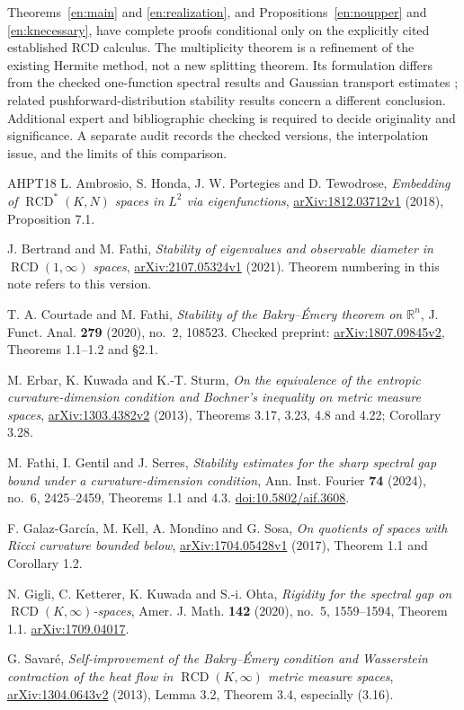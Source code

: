 \documentclass[12pt]{amsart}
\theoremstyle{definition}
\theoremstyle{remark}
\numberwithin{equation}{section}
\newcommand{\R}{\mathbb{R}}
\theoremstyle{plain}
\begin{document}
Theorems~\ref{en:main} and \ref{en:realization}, and
Propositions~\ref{en:noupper} and \ref{en:knecessary}, have complete
proofs conditional only on the explicitly cited established RCD calculus.
The multiplicity theorem is a refinement of the existing Hermite method,
not a new splitting theorem. Its formulation differs from the checked
one-function spectral results and Gaussian transport estimates
\cite{en:BF,en:CF}; related pushforward-distribution stability results
\cite{en:Serres} concern a different conclusion. Additional expert and
bibliographic checking is required to decide originality and significance.
A separate audit records the checked versions, the interpolation issue,
and the limits of this comparison.
\begin{thebibliography}{AHPT18}
L. Ambrosio, S. Honda, J. W. Portegies and D. Tewodrose,
\emph{Embedding of $\operatorname{RCD}^{*}(K,N)$ spaces in $L^2$ via eigenfunctions},
\href{https://arxiv.org/abs/1812.03712v1}{arXiv:1812.03712v1} (2018), Proposition 7.1.

J. Bertrand and M. Fathi,
\emph{Stability of eigenvalues and observable diameter in
$\operatorname{RCD}(1,\infty)$ spaces},
\href{https://arxiv.org/abs/2107.05324v1}{arXiv:2107.05324v1} (2021).
Theorem numbering in this note refers to this version.

T. A. Courtade and M. Fathi,
\emph{Stability of the Bakry--\'Emery theorem on $\R^n$},
J. Funct. Anal. \textbf{279} (2020), no.~2, 108523.
Checked preprint: \href{https://arxiv.org/abs/1807.09845v2}{arXiv:1807.09845v2},
Theorems 1.1--1.2 and \S2.1.

M. Erbar, K. Kuwada and K.-T. Sturm,
\emph{On the equivalence of the entropic curvature-dimension condition
and Bochner's inequality on metric measure spaces},
\href{https://arxiv.org/abs/1303.4382v2}{arXiv:1303.4382v2} (2013),
Theorems 3.17, 3.23, 4.8 and 4.22; Corollary 3.28.

M. Fathi, I. Gentil and J. Serres,
\emph{Stability estimates for the sharp spectral gap bound under a
curvature-dimension condition},
Ann. Inst. Fourier \textbf{74} (2024), no.~6, 2425--2459,
Theorems 1.1 and 4.3.
\href{https://doi.org/10.5802/aif.3608}{doi:10.5802/aif.3608}.

F. Galaz-Garc\'ia, M. Kell, A. Mondino and G. Sosa,
\emph{On quotients of spaces with Ricci curvature bounded below},
\href{https://arxiv.org/abs/1704.05428v1}{arXiv:1704.05428v1} (2017),
Theorem 1.1 and Corollary 1.2.

N. Gigli, C. Ketterer, K. Kuwada and S.-i. Ohta,
\emph{Rigidity for the spectral gap on $\operatorname{RCD}(K,\infty)$-spaces},
Amer. J. Math. \textbf{142} (2020), no.~5, 1559--1594,
Theorem 1.1.
\href{https://arxiv.org/abs/1709.04017}{arXiv:1709.04017}.

G. Savar\'e,
\emph{Self-improvement of the Bakry--\'Emery condition and Wasserstein
contraction of the heat flow in $\operatorname{RCD}(K,\infty)$ metric measure spaces},
\href{https://arxiv.org/abs/1304.0643v2}{arXiv:1304.0643v2} (2013),
Lemma 3.2, Theorem 3.4, especially (3.16).
\end{thebibliography}
\end{document}
